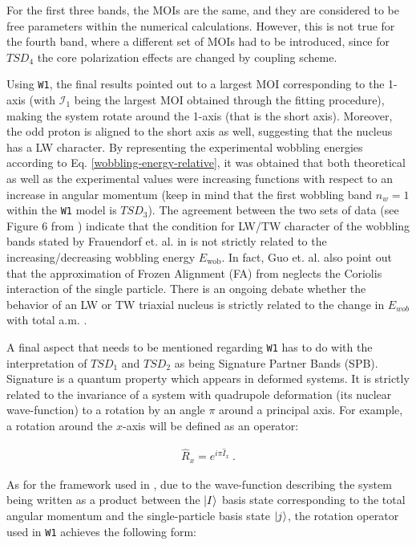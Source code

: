 \documentclass[11pt]{article}
\begin{document}
For the first three bands, the MOIs are the same, and they are considered to be free parameters within the numerical calculations. However, this is not true for the fourth band, where a different set of MOIs had to be introduced, since for $TSD_4$ the core polarization effects are changed by coupling scheme.

Using \texttt{W1}, the final results pointed out to a largest MOI corresponding to the 1-axis (with $\mathcal{I}_1$ being the largest MOI obtained through the fitting procedure), making the system rotate around the 1-axis (that is the short axis). Moreover, the odd proton is aligned to the short axis as well, suggesting that the nucleus has a LW character. By representing the experimental wobbling energies according to Eq. \ref{wobbling-energy-relative}, it was obtained that both theoretical as well as the experimental values were increasing functions with respect to an increase in angular momentum (keep in mind that the first wobbling band $n_w=1$ within the \texttt{W1} model is $TSD_3$). The agreement between the two sets of data (see Figure 6 from \cite{raduta2020approach}) indicate that the condition for LW/TW character of the wobbling bands stated by Frauendorf et. al. in \cite{frauendorf2014transverse} is not strictly related to the increasing/decreasing wobbling energy $E_\text{wob}$. In fact, Guo et. al. \cite{guo2020risk} also point out that the approximation of Frozen Alignment (FA) from \cite{frauendorf2014transverse} neglects the Coriolis interaction of the single particle. There is an ongoing debate whether the behavior of an LW or TW triaxial nucleus is strictly related to the change in $E_{wob}$ with total a.m. \cite{tanabe2017stability,frauendorf2018comment,tanabe2018reply}.


A final aspect that needs to be mentioned regarding \texttt{W1} has to do with the interpretation of $TSD_1$ and $TSD_2$ as being Signature Partner Bands (SPB). Signature \cite{bohr1998nuclear} is a quantum property which appears in deformed systems. It is strictly related to the invariance of a system with quadrupole deformation (its nuclear wave-function) to a rotation by an angle $\pi$ around a principal axis. For example, a rotation around the $x$-axis will be defined as an operator:

\begin{align}
    \hat{R}_x=e^{i\pi\hat{I}_x}\ .
\end{align}

As for the framework used in \cite{raduta2020approach,raduta2020towards}, due to the wave-function describing the system being written as a product between the $\ket{I}$ basis state corresponding to the total angular momentum and the single-particle basis state $\ket{j}$, the rotation operator used in \texttt{W1} achieves the following form:
\end{document}
